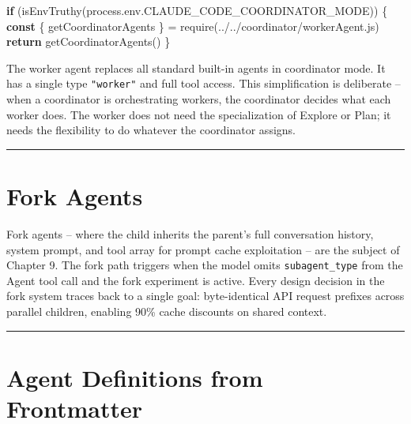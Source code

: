 \documentclass[
  english,
  11pt,
  letterpaper,
]{book}
\newenvironment{Shaded}{\begin{snugshade}}{\end{snugshade}}
\newcommand{\AttributeTok}[1]{\textcolor[rgb]{0.40,0.45,0.13}{#1}}
\newcommand{\BuiltInTok}[1]{\textcolor[rgb]{0.00,0.23,0.31}{#1}}
\newcommand{\ControlFlowTok}[1]{\textcolor[rgb]{0.00,0.23,0.31}{\textbf{#1}}}
\newcommand{\FunctionTok}[1]{\textcolor[rgb]{0.28,0.35,0.67}{#1}}
\newcommand{\KeywordTok}[1]{\textcolor[rgb]{0.00,0.23,0.31}{\textbf{#1}}}
\newcommand{\NormalTok}[1]{\textcolor[rgb]{0.00,0.23,0.31}{#1}}
\newcommand{\OperatorTok}[1]{\textcolor[rgb]{0.37,0.37,0.37}{#1}}
\newcommand{\PreprocessorTok}[1]{\textcolor[rgb]{0.68,0.00,0.00}{#1}}
\newcommand{\StringTok}[1]{\textcolor[rgb]{0.13,0.47,0.30}{#1}}
\begin{document}
\begin{Shaded}
\begin{Highlighting}[]
\ControlFlowTok{if}\NormalTok{ (}\FunctionTok{isEnvTruthy}\NormalTok{(}\BuiltInTok{process}\OperatorTok{.}\AttributeTok{env}\OperatorTok{.}\AttributeTok{CLAUDE\_CODE\_COORDINATOR\_MODE}\NormalTok{)) \{}
  \KeywordTok{const}\NormalTok{ \{ getCoordinatorAgents \} }\OperatorTok{=} \PreprocessorTok{require}\NormalTok{(}\StringTok{\textquotesingle{}../../coordinator/workerAgent.js\textquotesingle{}}\NormalTok{)}
  \ControlFlowTok{return} \FunctionTok{getCoordinatorAgents}\NormalTok{()}
\NormalTok{\}}
\end{Highlighting}
\end{Shaded}

The worker agent replaces all standard built-in agents in coordinator
mode. It has a single type \texttt{"worker"} and full tool access. This
simplification is deliberate -- when a coordinator is orchestrating
workers, the coordinator decides what each worker does. The worker does
not need the specialization of Explore or Plan; it needs the flexibility
to do whatever the coordinator assigns.

\begin{center}\rule{0.5\linewidth}{0.5pt}\end{center}

\section{Fork Agents}\label{fork-agents}

Fork agents -- where the child inherits the parent's full conversation
history, system prompt, and tool array for prompt cache exploitation --
are the subject of Chapter 9. The fork path triggers when the model
omits \texttt{subagent\_type} from the Agent tool call and the fork
experiment is active. Every design decision in the fork system traces
back to a single goal: byte-identical API request prefixes across
parallel children, enabling 90\% cache discounts on shared context.

\begin{center}\rule{0.5\linewidth}{0.5pt}\end{center}

\section{Agent Definitions from
Frontmatter}\label{agent-definitions-from-frontmatter}
\end{document}
